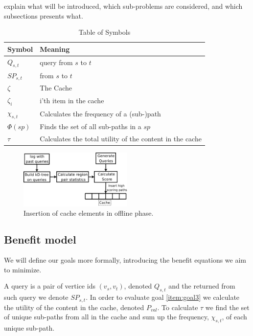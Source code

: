 explain what will be introduced, which sub-problems are considered, and which subsections presents what.


\begin{table}
\begin{tabular*}{\columnwidth}{|l||p{}|}
\hline
\bf Symbol		& \bf Meaning \\\hline
$Q_{s,t}$		& \spath query from $s$ to $t$ \\\hline
$SP_{s,t}$		& \spath from $s$ to $t$ \\\hline
$\zeta$ 		& The Cache \\\hline
$\zeta_i$		& i'th item in the cache \\\hline
$\chi_{s,t}$		& Calculates the frequency of a (sub-)path \\\hline
$\Phi(sp)$		& Finds the set of all sub-paths in a \spath $sp$ \\\hline
$\tau$			& Calculates the total utility of the content in the cache \\\hline 
\end{tabular*}
\caption{Table of Symbols}
\label{tab:symbols}
\end{table}


\begin{figure}[bht]
  \center
        \includegraphics[width=0.5\textwidth]{figures/fillcache}
        \caption{Insertion of cache elements in offline phase.}
  \label{fig:fillcache}
\end{figure}


\subsection{Benefit model}

We will define our goals more formally, introducing the benefit equations we aim to minimize.

A query is a pair of vertice ids $(v_s, v_t)$, denoted $Q_{s,t}$ and the \spath returned from such query we denote $SP_{s,t}$. 
In order to evaluate goal \ref{item:goal3} we calculate the utility of the content in the cache, denoted $P_{val}$. To calculate $\tau$ we find the set of unique sub-paths from all \spaths in the cache and sum up the frequency, $\chi_{s,t}$, of each unique sub-path.

